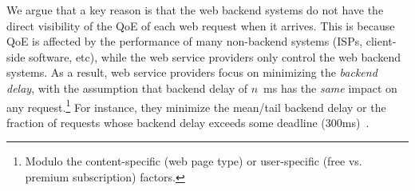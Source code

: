 We argue that a key reason is that the web backend systems do not have the direct visibility of the QoE of each web request when it arrives. 
This is because QoE is affected by the performance of many non-backend systems (ISPs, client-side software, etc), while the web service providers only control the web backend systems.
As a result, web service providers focus on minimizing the {\em backend delay}, with the assumption that backend delay of $n$~ms has the {\em same} impact on any request.\footnote{Modulo the content-specific (\eg web page type) or user-specific (\eg free vs. premium subscription) factors.}
For instance, they minimize the mean/tail backend delay or the fraction of requests whose backend delay exceeds some deadline (\eg 300ms)~\cite{??,??}.

